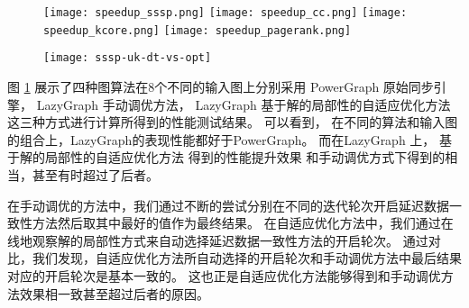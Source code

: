 \begin{figure}[h]
	\centering
  \captionsetup{justification=centering}
	{\texttt{[image: speedup\_sssp.png]}}
  \hspace{4em}%
	{\texttt{[image: speedup\_cc.png]}}
	\hspace{4em}%
	{\texttt{[image: speedup\_kcore.png]}}
	\hspace{4em}%
	{\texttt{[image: speedup\_pagerank.png]}}
	\label{fig:speedup_four_algorithm}
\end{figure}


\begin{figure}[h]
  \centering
  \captionsetup{justification=centering}
  \texttt{[image: sssp-uk-dt-vs-opt]}
  \label{fig:dt-vs-opt}
\end{figure}

图 \ref{fig:speedup_four_algorithm} 展示了四种图算法在8个不同的输入图上分别采用
PowerGraph 原始同步引擎，
LazyGraph 手动调优方法，
LazyGraph 基于解的局部性的自适应优化方法
这三种方式进行计算所得到的性能测试结果。
可以看到，
在不同的算法和输入图的组合上，LazyGraph的表现性能都好于PowerGraph。
而在LazyGraph 上， 基于解的局部性的自适应优化方法
得到的性能提升效果
和手动调优方式下得到的相当，甚至有时超过了后者。

在手动调优的方法中，我们通过不断的尝试分别在不同的迭代轮次开启延迟数据一致性方法然后取其中最好的值作为最终结果。
在自适应优化方法中，我们通过在线地观察解的局部性方式来自动选择延迟数据一致性方法的开启轮次。
通过对比，我们发现，自适应优化方法所自动选择的开启轮次和手动调优方法中最后结果对应的开启轮次是基本一致的。
这也正是自适应优化方法能够得到和手动调优方法效果相一致甚至超过后者的原因。



